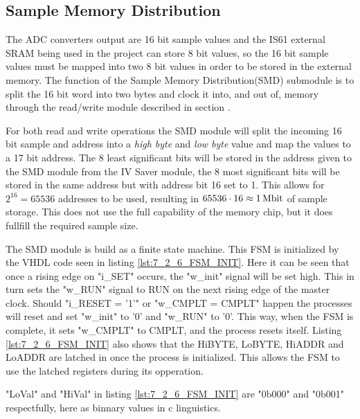\subsection{Sample Memory Distribution} \label{subsec:Sample_Memory_Distribution} 
The ADC converters output are 16 bit sample values and the IS61 external SRAM being used in the project can store 8 bit values, so the 16 bit sample values must be mapped into two 8 bit values in order to be stored in the external memory. The function of the Sample Memory Distribution(SMD) submodule is to split the 16 bit word into two bytes and clock it into, and out of, memory through the read/write module described in section .

For both read and write operations the SMD module will split the incoming 16 bit sample and address into a \textit{high byte} and \textit{low byte} value and map the values to a 17 bit address. The 8 least significant bits will be stored in the address given to the SMD module from the IV Saver module, the 8 most significant bits will be stored in the same address but with address bit 16 set to 1. This allows for $2^{16} = 65536$ addresses to be used, resulting in $65536\cdot16 \approx \SIQ{1}{\mega\bit}$ of sample storage. This does not use the full capability of the memory chip, but it does fullfill the required sample size. 

The SMD module is build as a finite state machine. This FSM is initialized by the VHDL code seen in listing \ref{lst:7_2_6_FSM_INIT}. Here it can be seen that once a rising edge on "i\_SET" occurs, the "w\_init" signal will be set high. This in turn sets the "w\_RUN" signal to RUN on the next rising edge of the  master clock. Should "i\_RESET = '1'" or "w\_CMPLT = CMPLT" happen the processes will reset and set "w\_init" to '0' and "w\_RUN" to '0'. This way, when the FSM is complete, it sets "w\_CMPLT" to CMPLT, and the process resets itself. Listing \ref{lst:7_2_6_FSM_INIT} also shows that the HiBYTE, LoBYTE, HiADDR and LoADDR are latched in once the process is initialized. This allows the FSM to use the latched registers during its opperation. 

"LoVal" and "HiVal" in listing \ref{lst:7_2_6_FSM_INIT} are "0b000" and "0b001" respectfully, here as binnary values in c linguistics.

 

